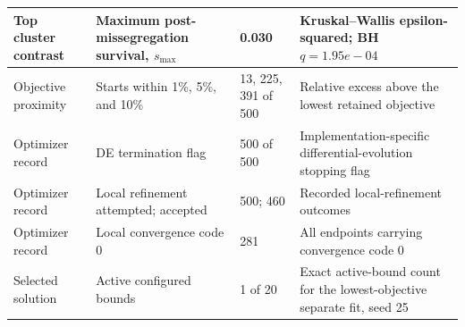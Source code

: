 \begin{longtable}{@{}p{}p{}p{}p{}@{}}
Top cluster contrast & Maximum post-missegregation survival, $s_{\max}$ & 0.030 & Kruskal--Wallis epsilon-squared; BH $q=1.95e-04$ \\
\midrule
Objective proximity & Starts within 1\%, 5\%, and 10\% & 13, 225, 391 of 500 & Relative excess above the lowest retained objective \\
Optimizer record & DE termination flag & 500 of 500 & Implementation-specific differential-evolution stopping flag \\
Optimizer record & Local refinement attempted; accepted & 500; 460 & Recorded local-refinement outcomes \\
Optimizer record & Local convergence code 0 & 281 & All endpoints carrying convergence code 0 \\
Selected solution & Active configured bounds & 1 of 20 & Exact active-bound count for the lowest-objective separate fit, seed 25 \\
\bottomrule
\end{longtable}
\endgroup
